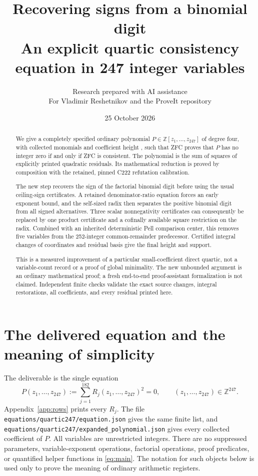 \documentclass[11pt,letterpaper]{article}
\title{\textbf{Recovering signs from a binomial digit}\\[0.5em]
\large An explicit quartic consistency equation in 247 integer variables}
\author{Research prepared with AI assistance\\
\small For Vladimir Reshetnikov and the ProveIt repository}
\date{25 October 2026}
\newcommand{\ZZ}{\mathbb Z}
\newcommand{\file}[1]{\texttt{\nolinkurl{#1}}}
\begin{document}
\maketitle
\begin{abstract}
We give a completely specified ordinary polynomial
$P\in\ZZ[z_1,\ldots,z_{247}]$ of degree four, with \FinalTerms{} collected
monomials and coefficient height \FinalHeight{}, such that ZFC proves
that $P$ has no integer zero if and only if ZFC is consistent. The polynomial
is the sum of squares of \FinalRows{} explicitly printed quadratic
residuals. Its mathematical reduction is proved by composition with the
retained, pinned C222 refutation calibration.

The new step recovers the sign of the factorial binomial digit before
using the usual ceiling-sign certificates. A retained denominator-ratio
equation forces an early exponent bound, and the self-sized radix then
separates the positive binomial digit from all signed alternatives.
Three scalar nonnegativity certificates can consequently be replaced by
one product certificate and a cofinally available square restriction on
the radix. Combined with an inherited deterministic Pell comparison
center, this removes five variables from the 252-integer common-remainder
predecessor. Certified integral changes of coordinates and residual basis
give the final height and support.

This is a measured improvement of a particular small-coefficient direct
quartic, not a variable-count record or a proof of global minimality.
The new unbounded argument is an ordinary mathematical proof; a fresh
end-to-end proof-assistant formalization is not claimed. Independent
finite checks validate the exact source changes, integral restorations,
all coefficients, and every residual printed here.
\end{abstract}
\clearpage
\tableofcontents
\clearpage

\section{The delivered equation and the meaning of simplicity}
\label{sec:equation}

The deliverable is the single equation
\begin{equation}\label{eq:main}
 \boxed{\quad P(z_1,\ldots,z_{247})
       :=\sum_{j=1}^{182}R_j(z_1,\ldots,z_{247})^2=0,
       \qquad (z_1,\ldots,z_{247})\in\ZZ^{247}.\quad}
\end{equation}
Appendix~\ref{app:rows} prints every $R_j$. The file
\file{equations/quartic247/equation.json} gives the same finite list, and
\file{equations/quartic247/expanded_polynomial.json} gives every collected
coefficient of $P$. All variables are unrestricted integers. There are
no suppressed parameters, variable-exponent operations, factorial
operations, proof predicates, or quantified helper functions in
\eqref{eq:main}. The notation for such objects below is used only to
prove the meaning of ordinary arithmetic registers.
\end{document}
